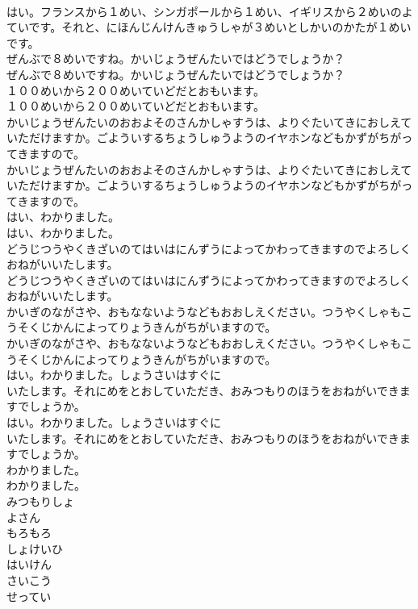 \documentclass[8pt]{extreport}
\begin{document}
\begin{CJK}{UTF8}{min}
\\	はい。フランスから１めい、シンガポールから１めい、イギリスから２めいのよていです。それと、にほんじんけんきゅうしゃが３めいとしかいのかたが１めいです。 
\\	ぜんぶで８めいですね。かいじょうぜんたいではどうでしょうか？	
\\	ぜんぶで８めいですね。かいじょうぜんたいではどうでしょうか？ 
\\	１００めいから２００めいていどだとおもいます。	
\\	１００めいから２００めいていどだとおもいます。 
\\	かいじょうぜんたいのおおよそのさんかしゃすうは、よりぐたいてきにおしえていただけますか。ごよういするちょうしゅうようのイヤホンなどもかずがちがってきますので。	
\\	かいじょうぜんたいのおおよそのさんかしゃすうは、よりぐたいてきにおしえていただけますか。ごよういするちょうしゅうようのイヤホンなどもかずがちがってきますので。 
\\	はい、わかりました。	
\\	はい、わかりました。 
\\	どうじつうやくきざいのてはいはにんずうによってかわってきますのでよろしくおねがいいたします。	
\\	どうじつうやくきざいのてはいはにんずうによってかわってきますのでよろしくおねがいいたします。 
\\	かいぎのながさや、おもなないようなどもおおしえください。つうやくしゃもこうそくじかんによってりょうきんがちがいますので。	
\\	かいぎのながさや、おもなないようなどもおおしえください。つうやくしゃもこうそくじかんによってりょうきんがちがいますので。 
\\	はい。わかりました。しょうさいはすぐに
\\	いたします。それにめをとおしていただき、おみつもりのほうをおねがいできますでしょうか。	
\\	はい。わかりました。しょうさいはすぐに
\\	いたします。それにめをとおしていただき、おみつもりのほうをおねがいできますでしょうか。 
\\	わかりました。	
\\	わかりました。 
\\	みつもりしょ
\\	よさん
\\	もろもろ
\\	しょけいひ
\\	はいけん
\\	さいこう
\\	せってい

\end{CJK}
\end{document}
